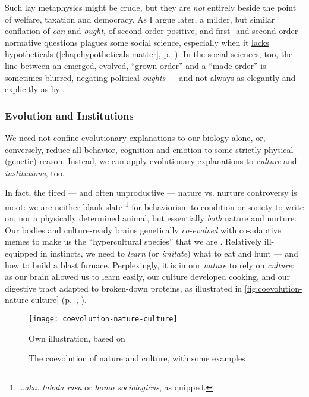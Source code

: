 Such lay metaphysics might be crude, but they are \emph{not} entirely beside the point of welfare, taxation and democracy.
As I argue later, a milder, but similar conflation of \emph{can} and \emph{ought}, of second-order positive, and first- and second-order normative questions plagues some social science, especially when it \hyperref[chap:hypotheticals-matter]{lacks hypotheticals} (\autoref{chap:hypotheticals-matter}, p.~\pageref{chap:hypotheticals-matter}).
In the social sciences, too, the line between an emerged, evolved, ``grown order'' and a ``made order'' is sometimes blurred, negating political \emph{oughts} --- and not always as elegantly and explicitly as by \cite[37]{Hayek1973}.

\subsubsection{Evolution and Institutions}
We need not confine evolutionary explanations to our biology alone, or, conversely, reduce all behavior, cognition and emotion to some strictly physical (genetic) reason.
Instead, we can apply evolutionary explanations to \emph{culture} and \emph{institutions}, too.

In fact, the tired --- and often unproductive --- nature vs. nurture controversy is moot: we are neither blank slate
\footnote{
	\ldots \emph{aka.} \emph{tabula rasa} or \emph{homo sociologicus}, as \cite{Dahrendorf1965} quipped.
}
for behaviorism to condition or society to write on, nor a physically determined animal, but essentially \emph{both} nature and nurture.
Our bodies and culture-ready brains genetically \emph{co-evolved} with co-adaptive memes \citep{Dawkins1976} to make us the ``hypercultural species'' that we are \citep[K175]{Henrich2007}.
Relatively ill-equipped in instincts, we need to \emph{learn} (or \emph{imitate}) what to eat and hunt --- and how to build a blast furnace.
Perplexingly, it is in our \emph{nature} to rely on \emph{culture}: as our brain allowed us to learn easily, our culture developed cooking, and our digestive tract adapted to broken-down proteins, as illustrated in \autoref{fig:coevolution-nature-culture} (p.~\pageref{fig:coevolution-nature-culture}, \citealt[confer][]{Henrich2007}).

\begin{figure}[htbp]
	\begin{center}
	\texttt{[image: coevolution-nature-culture]}
	\caption[Coevolution of Nature and Culture]{The coevolution of nature and culture, with some examples}
	\end{center}
	\scriptsize{Own illustration, based on \citet[K120ff]{Henrich2007}}
	\label{fig:coevolution-nature-culture}
\end{figure}

